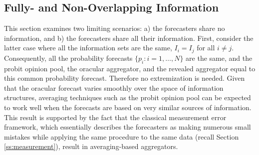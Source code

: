 \documentclass[11pt]{article}
\theoremstyle{definition}
\theoremstyle{definition}
\begin{document}
\subsection{Fully- and Non-Overlapping Information}
\label{disjoint}
This section examines two limiting scenarios: a) the forecasters share no information, and b) the forecasters share all their information. First, consider the latter case where all the information sets are the same, $I_{i} = I_j$ for all $i \neq j$. Consequently, all the probability forecasts $\{p_i : i = 1, \dots, N\}$ are the same, and the probit opinion pool, the oracular aggregator, and the revealed aggregator equal to this common probability forecast. Therefore no extremization is needed. Given that the oracular forecast varies smoothly over the space of  information structures, averaging techniques such as the probit opinion pool can be expected to work well when the forecasts are based on very similar sources of information. This result is supported by the fact that the classical measurement error framework, which essentially describes the forecasters as making numerous small mistakes while applying the same procedure to the same data (recall Section \ref{ss:measurement}), result in averaging-based aggregators. 
%
\end{document}
